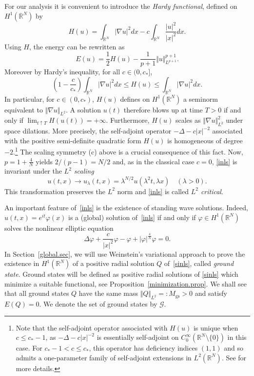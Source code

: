 \documentclass[reqno]{amsart}
\newcommand{\real}{\mathbb{R}}
\newcommand{\rn}{\real^N}
\newcommand{\ffi}{\varphi}
\newcommand{\sm}{\setminus}
\let\le=\leqslant
\theoremstyle{plain}
\theoremstyle{definition}
\numberwithin{equation}{section}
\begin{document}
For our analysis it is convenient to introduce the {\em Hardy functional}, 
defined on $H^1(\rn)$ by
\[
H(u)=\int_{\rn} |\nabla u|^2dx -c\int_{\rn}\frac{|u|^2}{|x|^2}dx.
\]
Using $H$, the energy can be rewritten as
\[
E(u)=\frac12 H(u) - \frac{1}{p+1}\Vert u\Vert_{L^{p+1}}^{p+1}.
\]
Moreover by Hardy's inequality, for all $c\in (0,c_*]$,
\begin{equation}\label{hardy2}
\left(1-\frac{c}{c_*}\right) \int_{\rn} |\nabla u|^2dx\le H(u)\le \int_{\rn} |\nabla u|^2dx.
\end{equation}
In particular, for $c\in(0,c_*)$, $H(u)$ defines on $H^1(\rn)$ a seminorm equivalent to 
$\Vert\nabla u\Vert_{L^2}$. A solution $u(t)$ therefore blows up at time $T>0$ if and only if
$\lim_{t\uparrow T} H(u(t))=+\infty$. Furthermore, $H(u)$ scales as $\Vert\nabla u\Vert_{L^2}^2$ 
under space dilations. More precisely, the self-adjoint operator $-\Delta-c|x|^{-2}$ 
associated with the positive semi-definite quadratic form $H(u)$ is homogeneous 
of degree $-2$.\footnote{Note that the self-adjoint operator associated with 
$H(u)$ is unique when $c\le c_*-1$, as $-\Delta-c|x|^{-2}$ is essentially self-adjoint 
on $C_0^\infty(\rn\sm\{0\})$ in this case. For $c_*-1<c\le c_*$, this operator 
has deficiency indices $(1,1)$ and so admits a one-parameter
family of self-adjoint extensions in $L^2(\rn)$. See \cite{visan0,kalf} for more details.} 
The scaling symmetry (c) above is a crucial consequence of this fact. Now, 
$p=1+\frac{4}{N}$ yields $2/(p-1)=N/2$ and, as in the classical case $c=0$, \eqref{inls} is
invariant under the {\em $L^2$ scaling}
\[
u(t,x) \to u_\lambda(t,x)=\lambda^{N/2}u(\lambda^2 t, \lambda x) \quad (\lambda>0).
\]
This transformation preserves the $L^2$ norm and \eqref{inls} is called {\em $L^2$ critical}.

An important feature of~\eqref{inls} is the existence of standing wave solutions.
Indeed, $u(t,x)=e^{it}\ffi(x)$ is a (global) solution of~\eqref{inls} if and only if
$\ffi\in H^1(\rn)$ solves the nonlinear elliptic equation
\begin{equation}\label{sinls}
\Delta\ffi + \frac{c}{|x|^2}\ffi - \ffi + |\ffi|^{\frac{4}{N}}\ffi=0.
\end{equation}
In Section~\ref{global.sec}, we will use Weinstein's variational approach \cite{w82} to 
prove the existence in $H^1(\rn)$ of a positive radial solution $Q$ of~\eqref{sinls}, 
called {\em ground state}. Ground states will be defined as positive radial solutions of \eqref{sinls}
which minimize a suitable functional, see Proposition~\ref{minimization.prop}.
We shall see that all ground states $Q$ have the same mass 
$\Vert Q\Vert_{L^2}=:M_\mathrm{gs}>0$ and satisfy $E(Q)=0$.
We denote the set of ground states by $\mathcal{G}$.
\end{document}
